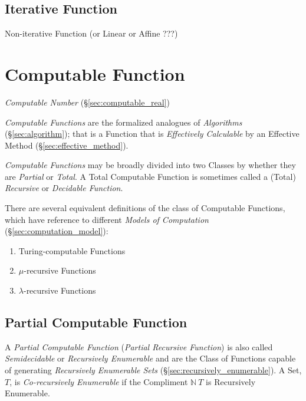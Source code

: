 \subsection{Iterative Function}\label{sec:iterative_function}

Non-iterative Function (or Linear or Affine ???) %



\section{Computable Function}\label{sec:computable_function}

\emph{Computable Number} (\S\ref{sec:computable_real})

\emph{Computable Functions} are the formalized analogues of
\emph{Algorithms} (\S\ref{sec:algorithm}); that is a Function that
is \emph{Effectively Calculable} by an Effective Method
(\S\ref{sec:effective_method}).

\emph{Computable Functions} may be broadly divided into two Classes by
whether they are \emph{Partial} or \emph{Total}. A Total Computable
Function is sometimes called a (Total) \emph{Recursive} or
\emph{Decidable Function}.

There are several equivalent definitions of the class of Computable
Functions, which have reference to different \emph{Models of
  Computation} (\S\ref{sec:computation_model}):
\begin{enumerate}
\item Turing-computable Functions
\item $\mu$-recursive Functions
\item $\lambda$-recursive Functions
\end{enumerate}



\subsection{Partial Computable Function}\label{sec:partial_computable}

A \emph{Partial Computable Function} (\emph{Partial Recursive
  Function}) is also called \emph{Semidecidable} or \emph{Recursively
  Enumerable} and are the Class of Functions capable of generating
\emph{Recursively Enumerable Sets}
(\S\ref{sec:recursively_enumerable}). A Set, $T$, is
\emph{Co-recursively Enumerable} if the Compliment $\mathbb{N} \ T$ is
Recursively Enumerable.

